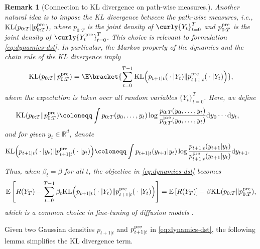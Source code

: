 \documentclass{article}
\newtheorem{Remark}[Theorem]{Remark}
\newcommand{\R}{\mathbb{R}}
\begin{document}
    
  
    \begin{Remark}[Connection to KL divergence on path-wise measures.]
    Another natural idea is to impose the KL divergence between the path-wise measures, i.e., $ {\rm KL}(p_{0:T} \| p_{0:T}^{\rm pre}) $, where $ p_{0:T} $ is the joint density of $ \curly{Y_{t}}_{t = 0}^{T} $ and $ p_{0:T}^{\rm pre} $ is the joint density of $ \curly{Y_{t}^{\rm pre}}_{t = 0}^{T} $. This choice is relevant to formulation \eqref{eq:dynamics-dst}. In particular, the Markov property of the dynamics and the chain rule of the KL divergence imply
    \begin{align*}
        {\rm KL}(p_{0:T} \| p_{0:T}^{\rm pre}) = \E\bracket{\sum_{t = 0}^{T-1}{\rm KL}\Big(p_{t+1\vert t}({}\cdot{}\vert Y_t) \|p_{t+1\vert t}^{\rm pre}({}\cdot{}\vert Y_t)\Big)},
    \end{align*}
    where the expectation is taken over all random variables $\{Y_t\}_{t = 0}^T$. Here, we define
    \begin{align}
        {\rm KL}(p_{0:T} \| p_{0:T}^{\rm pre}) & \coloneqq \int p_{0:T}(y_0, \dots, y_t)\log\frac{p_{0:T}(y_0, \dots, y_t)}{p_{0:T}^{\rm pre}(y_0, \dots, y_t)}{\rm d}y_0\cdots {\rm d}y_t, \label{eq:kl-path}
    \end{align} 
    and for given $y_t \in \R^d$, denote
    \begin{align}
        {\rm KL}\Big(p_{t+1\vert t}({}\cdot{}\vert y_t) \|p_{t+1\vert t}^{\rm pre}({}\cdot{}\vert y_t)\Big) & \coloneqq \int p_{t+1\vert t}(y_{t+1} \vert y_t) \log \frac{p_{t+1\vert t}(y_{t+1} \vert y_t)}{p^{\rm pre}_{t+1\vert t}(y_{t+1} \vert y_t)}{\rm d}y_{t+1}.  \label{eq:kl-condition}
    \end{align}
%
Thus, when $\beta_t = \beta$ for all $t$, the objective in \eqref{eq:dynamics-dst} becomes
\begin{align*}
    \mathbb{E}\left[R(Y_T) - \sum_{t = 0}^{T-1}\beta_t{\rm KL}\Big(p_{t+1\vert t}({}\cdot{}\vert Y_t) \|p_{t+1\vert t}^{\rm pre}({}\cdot{}\vert Y_t)\Big)\right] = \mathbb{E}\left[R(Y_T)\right] - \beta  {\rm KL}(p_{0:T} \| p_{0:T}^{\rm pre}),
\end{align*}
which is a common choice in fine-tuning of diffusion models \cite{fan2024reinforcement,black2023training,zhang2001some,gao2024reward}. 
%
    \end{Remark}
   
  Given two Gaussian densities $p_{t+1\vert t}$ and $p^{\rm pre}_{t+1\vert t}$ in  \eqref{eq:dynamics-dst}, the following lemma simplifies the KL divergence term.
\end{document}
